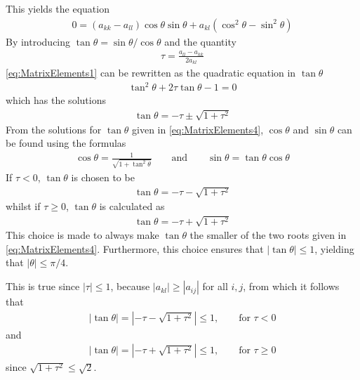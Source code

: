 This yields the equation
\begin{align}
	0 = (a_{kk} - a_{ll} ) \cos \theta \sin \theta + a_{kl} (\cos ^2 \theta - \sin ^2 \theta )
	\label{eq:MatrixElements1}
\end{align}
By introducing $\tan \theta = \sin \theta / \cos \theta$ and the quantity
\begin{align}
	\tau = \frac{a_{ll}-a_{kk}}{2a_{kl}}
	\label{eq:MatrixElements2}
\end{align}
\eqref{eq:MatrixElements1} can be rewritten as the quadratic equation in $\tan \theta$
\begin{align}
	\tan ^2 \theta + 2 \tau \tan \theta - 1 = 0
	\label{eq:MatrixElements3}
\end{align}
which has the solutions
\begin{align}
	\tan \theta = -\tau \pm \sqrt{1 + \tau ^2}
	\label{eq:MatrixElements4}
\end{align}
From the solutions for $\tan \theta$ given in \eqref{eq:MatrixElements4}, $\cos \theta$ and $\sin \theta$ can be found using the formulas 
\begin{align*}
	\cos \theta = \frac{1}{\sqrt{1+\tan ^2 \theta}} \qquad \text{and} \qquad \sin \theta = \tan \theta \cos \theta
\end{align*}
If $\tau < 0$, $\tan \theta$ is chosen to be
\begin{align}
	\tan \theta = -\tau - \sqrt{1 + \tau ^2}
	\label{eq:MatrixElements5}
\end{align}
whilst if $\tau \geq 0$, $\tan \theta$ is calculated as
\begin{align}
	\tan \theta = -\tau + \sqrt{1 + \tau ^2}
	\label{eq:MatrixElements6}
\end{align}
This choice is made to always make $\tan \theta$ the smaller of the two roots given in \eqref{eq:MatrixElements4}.
Furthermore, this choice ensures that $|\tan \theta | \leq 1$, yielding that $|\theta| \leq \pi/4$.

This is true since $|\tau| \leq 1$, because $|a_{kl}| \geq |a_{ij}|$ for all $i, j$, from which it follows that
\begin{align}
	|\tan \theta| = \left|-\tau - \sqrt{1 + \tau ^2}\right| 
	\leq 1 , \qquad \text{for } \tau < 0
\end{align}   
and
\begin{align}
	|\tan \theta| = \left|-\tau + \sqrt{1 + \tau ^2}\right|
	\leq 1 , \qquad \text{for } \tau \geq 0
\end{align} 
since $\sqrt{1+\tau^2} \leq \sqrt{2}$.

